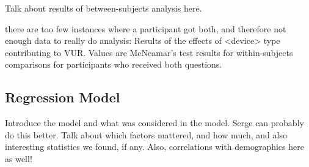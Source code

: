 \documentclass{acm_proc_article-sp}
\begin{document}
Talk about results of between-subjects analysis here. 
						

there are too few instances where a participant got both, and therefore not enough data to really do analysis: Results of the effects of <device> type contributing to VUR. Values are McNeamar's test results for within-subjects comparisons for participants who received both questions.


\subsection{Regression Model} 
Introduce the model and what was considered in the model. Serge can probably do this better. Talk about which factors mattered, and how much, and also interesting statistics we found, if any. Also, correlations with demographics here as well! 
\end{document}
